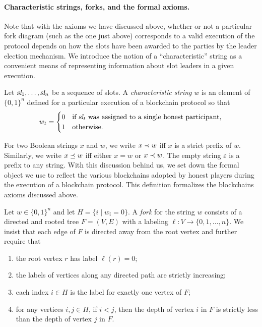 \paragraph{Characteristic strings, forks, and the formal axioms.}
Note that with the axioms we have discussed above, whether or not a
particular fork diagram (such as the one just above) corresponds to a valid
execution of the protocol depends on how the slots have been awarded to the parties by the
leader election mechanism. We introduce the notion of a ``characteristic'' string as a convenient
means of representing information about slot leaders in a given execution.
\begin{definition}
  Let $\textsl{sl}_1, \ldots, \textsl{sl}_{n}$ be a sequence of slots. A \emph{characteristic string} $w$ is an element of $\{0,1\}^n$ defined for a particular execution of a blockchain protocol so that
  \[
    w_t =   \begin{cases}
    0 & \text{if $\textsl{sl}_{t}$ was assigned to a single honest participant},\\
    1 & \text{otherwise.}
  \end{cases}
\]
\end{definition}
For two Boolean strings $x$ and $w$, 
we write $x \prec w$ iff $x$ is a strict prefix of $w$. 
Similarly, 
we write $x \preceq w$ iff either $x = w$ or $x \prec w$. 
The empty string $\varepsilon$ is a prefix to any string. 
With this discussion behind us, we set down the formal object we use
to reflect the various blockchains adopted by honest players during
the execution of a blockchain protocol. This definition formalizes the blockchains axioms discussed above.


\begin{definition}
  Let $w\in \{0,1\}^n$ and let $H = \{ i \mid w_i = 0\}$. A
  \emph{fork} for the string $w$ consists of a directed and rooted
  tree $F=(V,E)$ with a labeling $\ell:V\to\{0,1,\dots,n\}$. We insist
  that each edge of $F$ is directed away from the root vertex and
  further require that
  \begin{enumerate}[label=(F{\arabic*}.)]
  \item\label{fork:root} the root vertex $r$ has label $\ell(r)=0$;
  \item\label{fork:monotone} the labels of vertices along any directed path are strictly increasing;
  \item\label{fork:unique-honest} each index $i\in H$ is the label for exactly one vertex of $F$;
  \item\label{fork:honest-depth} for any  vertices $i,j\in H$, if $i<j$, then the depth of vertex $i$ in $F$ is strictly less than the depth of vertex $j$ in $F$.
  \end{enumerate}
\end{definition}

